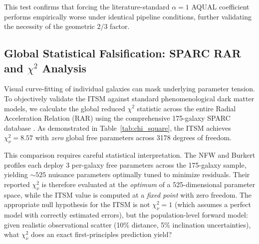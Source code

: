 \documentclass[aps,prd,10pt,twocolumn,superscriptaddress,nofootinbib,floatfix]{revtex4-2}
\begin{document}
This test confirms that forcing the literature-standard $\alpha=1$ AQUAL coefficient performs empirically worse under identical pipeline conditions, further validating the necessity of the geometric $2/3$ factor.


\subsection{\label{sec:falsification}Global Statistical Falsification: SPARC RAR and \texorpdfstring{$\chi^2$}{chi-square} Analysis}
Visual curve-fitting of individual galaxies can mask underlying parameter tension. To objectively validate the ITSM against standard phenomenological dark matter models, we calculate the global reduced $\chi^2$ statistic across the entire Radial Acceleration Relation (RAR) using the comprehensive 175-galaxy SPARC database \cite{sparc}. As demonstrated in Table~\ref{tab:chi_square}, the ITSM achieves $\chi^2_\nu = 8.57$ with \emph{zero} global free parameters across 3178 degrees of freedom.

This comparison requires careful statistical interpretation. The NFW and Burkert profiles each deploy 3 per-galaxy free parameters across the 175-galaxy sample, yielding $\sim 525$ nuisance parameters optimally tuned to minimize residuals. Their reported $\chi^2_\nu$ is therefore evaluated at the \emph{optimum} of a 525-dimensional parameter space, while the ITSM value is computed at a \emph{fixed point} with zero freedom. The appropriate null hypothesis for the ITSM is not $\chi^2_\nu = 1$ (which assumes a perfect model with correctly estimated errors), but the population-level forward model: given realistic observational scatter (10\% distance, 5\% inclination uncertainties), what $\chi^2_\nu$ does an exact first-principles prediction yield?
\end{document}
